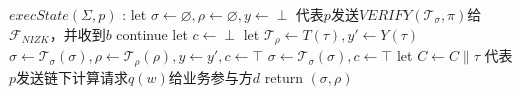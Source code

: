 \begin{breakablealgorithm}
\begin{algorithmic}
        \noindent\hrulefill
        \item[$execState(\Sigma, p)$]:
        \STATE let $\sigma \leftarrow \varnothing, \rho \leftarrow \varnothing, y \leftarrow \perp$
        \STATE 代表$p$发送$VERIFY(\mathcal{T}_\sigma, \pi)$给$\mathcal{F}_{NIZK}$，并收到$b$
        \STATE continue
        \ENDIF
        \STATE let $c \leftarrow \perp$
        \STATE let $\mathcal{T}_\rho \leftarrow T(\tau) , y' \leftarrow Y(\tau)$
        \STATE $\sigma \leftarrow \mathcal{T}_\sigma(\sigma), \rho \leftarrow \mathcal{T}_\rho(\rho), y \leftarrow y', c \leftarrow \top$
        \ENDIF
        \ELSE
        \STATE $\sigma \leftarrow \mathcal{T}_\sigma(\sigma), c \leftarrow \top$
        \ENDIF
        \ENDIF
        \STATE let $C \leftarrow C \parallel \tau$
        \STATE 代表$p$发送链下计算请求$q(w)$给业务参与方$d$
        \ENDIF
        \ENDFOR
        \ENDIF
        \ENDFOR
        \STATE return $(\sigma, \rho)$
    \end{algorithmic}
\end{breakablealgorithm}